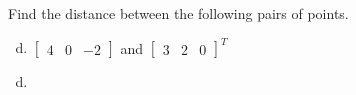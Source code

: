 \documentclass[../main.tex]{subfiles}
\begin{document}
Find the distance between the following pairs of points.
\begin{enumerate}[a)]
	\setcounter{enumi}{3}
	\item 
		$\begin{bmatrix}4&0&-2\end{bmatrix}$
		and
		$\begin{bmatrix}3&2&0\end{bmatrix}^T$
\end{enumerate}

\solution
\begin{enumerate}[a)]
	\setcounter{enumi}{3}
	\item 
\end{enumerate}
\end{document}
